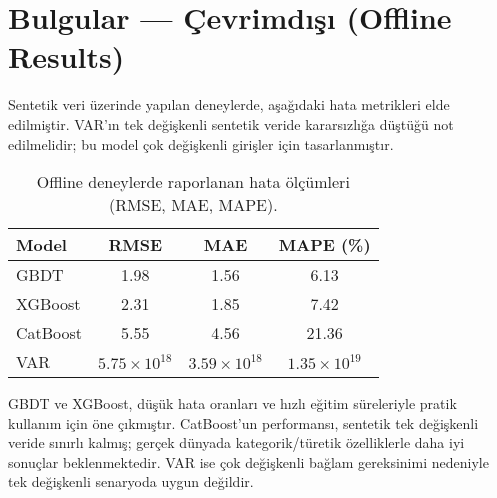 \section{Bulgular — Çevrimdışı (Offline Results)}

Sentetik veri üzerinde yapılan deneylerde, aşağıdaki hata metrikleri elde edilmiştir. VAR'ın tek değişkenli sentetik veride kararsızlığa düştüğü not edilmelidir; bu model çok değişkenli girişler için tasarlanmıştır.

\begin{table}[h]
    \centering
    \caption{Offline deneylerde raporlanan hata ölçümleri (RMSE, MAE, MAPE).}
    \label{tab:offline}
    \begin{tabular}{@{}lccc@{}}
        \toprule
        Model & RMSE & MAE & MAPE (\%) \\
        \midrule
        GBDT & 1.98 & 1.56 & 6.13 \\
        XGBoost & 2.31 & 1.85 & 7.42 \\
        CatBoost & 5.55 & 4.56 & 21.36 \\
        VAR & $5.75\times10^{18}$ & $3.59\times10^{18}$ & $1.35\times10^{19}$ \\
        \bottomrule
    \end{tabular}
\end{table}

GBDT ve XGBoost, düşük hata oranları ve hızlı eğitim süreleriyle pratik kullanım için öne çıkmıştır. CatBoost'un performansı, sentetik tek değişkenli veride sınırlı kalmış; gerçek dünyada kategorik/türetik özelliklerle daha iyi sonuçlar beklenmektedir. VAR ise çok değişkenli bağlam gereksinimi nedeniyle tek değişkenli senaryoda uygun değildir.

